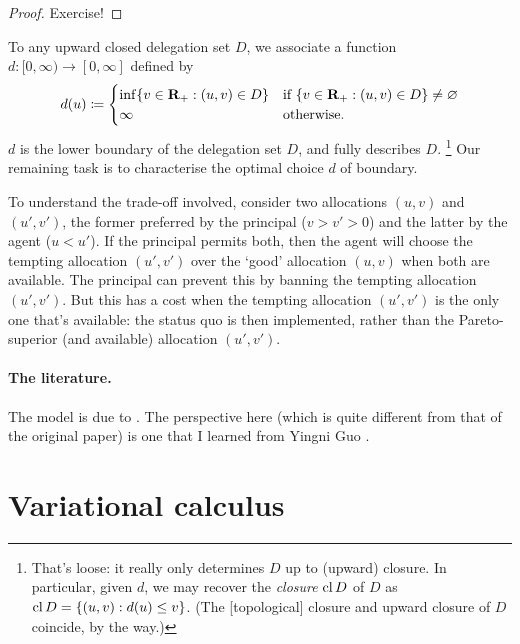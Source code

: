 \begin{proof}
	Exercise!
\end{proof}

To any upward closed delegation set $D$,
we associate a function $d : [0,\infty) \to [0,\infty]$ defined by
%
\begin{equation*}
	d(u)
	\coloneqq
	\begin{cases}
		\inf\left\{
		v \in \R_+ : (u,v) \in D
		\right\}
		& \text{if $\left\{
		v \in \R_+ : (u,v) \in D
		\right\} \neq \varnothing$} \\
		\infty
		& \text{otherwise.}
	\end{cases}
\end{equation*}
%
$d$ is the lower boundary of the delegation set $D$, and fully describes $D$.%
	\footnote{That's loose: it really only determines $D$ up to (upward) closure.
	In particular, given $d$, we may recover the \emph{closure} $\operatorname*{cl} D$ of $D$ as $\cl D = \left\{ (u,v) : d(u) \leq v \right\}$.
	(The [topological] closure and upward closure of $D$ coincide, by the way.)}
Our remaining task is to characterise the optimal choice $d$ of boundary.

To understand the trade-off involved,
consider two allocations $(u,v)$ and $(u',v')$, the former preferred by the principal ($v>v'>0$) and the latter by the agent ($u<u'$).
If the principal permits both, then the agent will choose the tempting allocation $(u',v')$ over the `good' allocation $(u,v)$ when both are available.
The principal can prevent this by banning the tempting allocation $(u',v')$.
But this has a cost when the tempting allocation $(u',v')$ is the only one that's available: the status quo is then implemented, rather than the Pareto-superior (and available) allocation $(u',v')$.


\paragraph{The literature.} The model is due to \textcite{ArmstrongVickers2010}. The perspective here (which is quite different from that of the original paper) is one that I learned from Yingni Guo \parencite[see][]{GuoShmaya2021}.



\section{Variational calculus}
\label{sec:ch4:variation}

